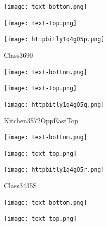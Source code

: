 \documentclass[letterpaper]{article}
\begin{document}
 \centerline{\texttt{[image: text-bottom.png]}} 
 
 \pagebreak 
{} 
 \vspace*{\fill} 
 
  \centerline{\texttt{[image: text-top.png]}} 
 
 \vspace{0.5in} 
 
 \begingroup 
 \centerline{\texttt{[image: httpbitly1q4gO5p.png]}} 
 \endgroup 
 \vspace*{\fill} 

 \hfill{\small Class3690} 

  \vspace{0.7in} 
 
 \centerline{\texttt{[image: text-bottom.png]}} 
 
 \pagebreak 
{} 
 \vspace*{\fill} 
 
  \centerline{\texttt{[image: text-top.png]}} 
 
 \vspace{0.5in} 
 
 \begingroup 
 \centerline{\texttt{[image: httpbitly1q4gO5q.png]}} 
 \endgroup 
 \vspace*{\fill} 

 \hfill{\small Kitchen3572OppEastTop} 

  \vspace{0.7in} 
 
 \centerline{\texttt{[image: text-bottom.png]}} 
 
 \pagebreak 
{} 
 \vspace*{\fill} 
 
  \centerline{\texttt{[image: text-top.png]}} 
 
 \vspace{0.5in} 
 
 \begingroup 
 \centerline{\texttt{[image: httpbitly1q4gO5r.png]}} 
 \endgroup 
 \vspace*{\fill} 

 \hfill{\small Class3435S} 

  \vspace{0.7in} 
 
 \centerline{\texttt{[image: text-bottom.png]}} 
 
 \pagebreak 
{} 
 \vspace*{\fill} 
 
  \centerline{\texttt{[image: text-top.png]}} 
 
 \vspace{0.5in} 
 
\end{document}

